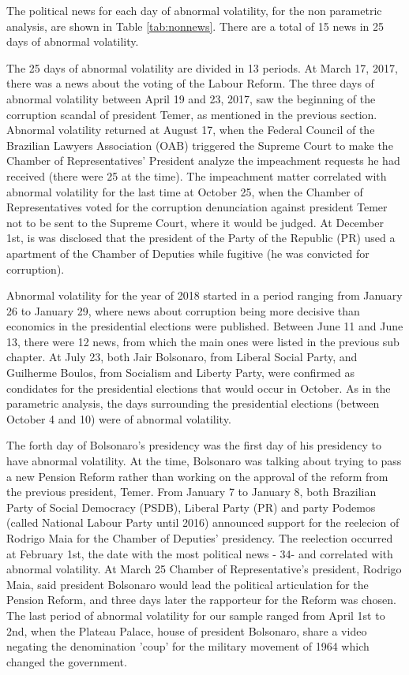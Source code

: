 \documentclass[cic,tc, english]{iiufrgs}
\begin{document}
    The political news for each day of abnormal volatility, for the non parametric analysis, are shown in Table \ref{tab:nonnews}. There are a total of 15 news in 25 days of abnormal volatility.

    

    The 25 days of abnormal volatility are divided in 13 periods. At March 17, 2017, there was a news about the voting of the Labour Reform. The three days of abnormal volatility between April 19 and 23, 2017, saw the beginning of the corruption scandal of president Temer, as mentioned in the previous section. Abnormal volatility returned at August 17, when the Federal Council of the Brazilian Lawyers Association (OAB) triggered the Supreme Court to make the Chamber of Representatives' President analyze the impeachment requests he had received (there were 25 at the time). The impeachment matter correlated with abnormal volatility for the last time at October 25, when the Chamber of Representatives voted for the corruption denunciation against president Temer not to be sent to the Supreme Court, where it would be judged. At December 1st, is was disclosed that the president of the Party of the Republic (PR) used a apartment of the Chamber of Deputies while fugitive (he was convicted for corruption).

    Abnormal volatility for the year of 2018 started in a period ranging from January 26 to January 29, where news about corruption being more decisive than economics in the presidential elections were published. Between June 11 and June 13, there were 12 news, from which the main ones were listed in the previous sub chapter. At July 23, both Jair Bolsonaro, from Liberal Social Party, and Guilherme Boulos, from Socialism and Liberty Party, were confirmed as condidates for the presidential elections that would occur in October. As in the parametric analysis, the days surrounding the presidential elections (between October 4 and 10) were of abnormal volatility.

    The forth day of Bolsonaro's presidency was the first day of his presidency to have abnormal volatility. At the time, Bolsonaro was talking about trying to pass a new Pension Reform rather than working on the approval of the reform from the previous president, Temer. From January 7 to January 8, both Brazilian Party of Social Democracy (PSDB), Liberal Party (PR) and party Podemos (called National Labour Party until 2016) announced support for the reelecion of Rodrigo Maia for the Chamber of Deputies' presidency. The reelection occurred at February 1st, the date with the most political news - 34- and correlated with abnormal volatility. At March 25 Chamber of Representative's president, Rodrigo Maia, said president Bolsonaro would lead the political articulation for the Pension Reform, and three days later the rapporteur for the Reform was chosen. The last period of abnormal volatility for our sample ranged from April 1st to 2nd, when the Plateau Palace, house of president Bolsonaro, share a video negating the denomination 'coup' for the military movement of 1964 which changed the government.
\end{document}
